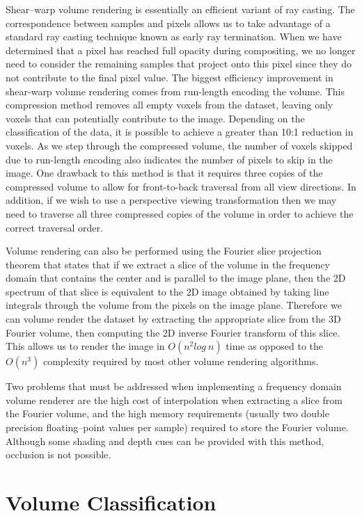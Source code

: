 Shear--warp volume rendering is essentially an efficient variant of ray casting. The correspondence between samples and pixels allows us to take advantage of a standard ray casting technique known as early ray termination. When we have determined that a pixel has reached full opacity during compositing, we no longer need to consider the remaining samples that project onto this pixel since they do not contribute to the final pixel value. The biggest efficiency improvement in shear-warp volume rendering comes from run-length encoding the volume. This compression method removes all empty voxels from the dataset, leaving only voxels that can potentially contribute to the image. Depending on the classification of the data, it is possible to achieve a greater than 10:1 reduction in voxels. As we step through the compressed volume, the number of voxels skipped due to run-length encoding also indicates the number of pixels to skip in the image. One drawback to this method is that it requires three copies of the compressed volume to allow for front-to-back traversal from all view directions. In addition, if we wish to use a perspective viewing transformation then we may need to traverse all three compressed copies of the volume in order to achieve the correct traversal order.

Volume rendering can also be performed using the Fourier slice projection theorem \cite{Totsuka92} that states that if we extract a slice of the volume in the frequency domain that contains the center and is parallel to the image plane, then the 2D spectrum of that slice is equivalent to the 2D image obtained by taking line integrals through the volume from the pixels on the image plane. Therefore we can volume render the dataset by extracting the appropriate slice from the 3D Fourier volume, then computing the 2D inverse Fourier transform of this slice. This allows us to render the image in $O(n^2log\ n)$ time as opposed to the $O(n^3)$ complexity required by most other volume rendering algorithms.

Two problems that must be addressed when implementing a frequency domain volume renderer are the high cost of interpolation when extracting a slice from the Fourier volume, and the high memory requirements (usually two double precision floating--point values per sample) required to store the Fourier volume. Although some shading and depth cues can be provided with this method, occlusion is not possible.

\section{Volume Classification}

